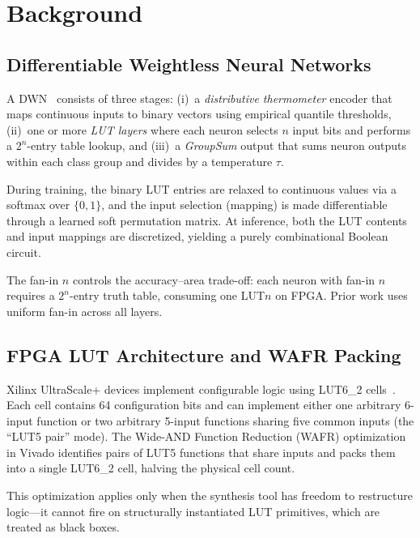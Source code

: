 \documentclass[conference]{IEEEtran}
\begin{document}
\section{Background}
\label{sec:background}

\subsection{Differentiable Weightless Neural Networks}

A DWN~\cite{bacellar2024dwn} consists of three stages: (i)~a \emph{distributive thermometer} encoder that maps continuous inputs to binary vectors using empirical quantile thresholds, (ii)~one or more \emph{LUT layers} where each neuron selects $n$ input bits and performs a $2^n$-entry table lookup, and (iii)~a \emph{GroupSum} output that sums neuron outputs within each class group and divides by a temperature $\tau$.

During training, the binary LUT entries are relaxed to continuous values via a softmax over $\{0,1\}$, and the input selection (mapping) is made differentiable through a learned soft permutation matrix.
At inference, both the LUT contents and input mappings are discretized, yielding a purely combinational Boolean circuit.

The fan-in $n$ controls the accuracy--area trade-off: each neuron with fan-in $n$ requires a $2^n$-entry truth table, consuming one LUT$n$ on FPGA.
Prior work uses uniform fan-in across all layers.

\subsection{FPGA LUT Architecture and WAFR Packing}

Xilinx UltraScale+ devices implement configurable logic using LUT6\_2 cells~\cite{xilinx2021ultrascale}.
Each cell contains 64 configuration bits and can implement either one arbitrary 6-input function or two arbitrary 5-input functions sharing five common inputs (the ``LUT5 pair'' mode).
The Wide-AND Function Reduction (WAFR) optimization in Vivado identifies pairs of LUT5 functions that share inputs and packs them into a single LUT6\_2 cell, halving the physical cell count.

This optimization applies only when the synthesis tool has freedom to restructure logic---it cannot fire on structurally instantiated LUT primitives, which are treated as black boxes.
\end{document}
